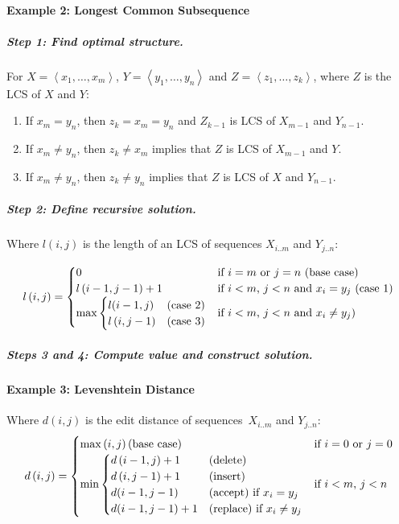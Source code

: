 \documentclass[twocolumn,english]{article}
\numberwithin{equation}{section}
\numberwithin{figure}{section}
\numberwithin{table}{section}
\begin{document}
\paragraph{Example 2: Longest Common Subsequence}

\subparagraph{Step 1: Find optimal structure.}

For $X=\left\langle x_{1},\dots,x_{m}\right\rangle $, $Y=\left\langle y_{1},\dots,y_{n}\right\rangle $
and $Z=\left\langle z_{1},\dots,z_{k}\right\rangle $, where $Z$
is the LCS of $X$ and $Y$:
\begin{enumerate}
\item If $x_{m}=y_{n}$, then $z_{k}=x_{m}=y_{n}$ and $Z_{k-1}$ is LCS
of $X_{m-1}$ and $Y_{n-1}$.
\item If $x_{m}\neq y_{n}$, then $z_{k}\neq x_{m}$ implies that $Z$ is
LCS of $X_{m-1}$ and $Y$.
\item If $x_{m}\neq y_{n}$, then $z_{k}\neq y_{n}$ implies that $Z$ is
LCS of $X$ and $Y_{n-1}$.
\end{enumerate}

\subparagraph{Step 2: Define recursive solution.}

Where $l\left(i,j\right)$ is the length of an LCS of sequences $X_{i..m}$
and $Y_{j..n}$:

\[
l\left(i,j\right)=\begin{cases}
0 & \text{if \ensuremath{i=m} or \ensuremath{j=n} (base case)}\\
l\left(i-1,j-1\right)+1 & \text{if \ensuremath{i<m}, \ensuremath{j<n} and \ensuremath{x_{i}=y_{j}} (case 1)}\\
\max\begin{cases}
l(i-1,j) & \text{(case 2)}\\
l\left(i,j-1\right) & \text{(case 3)}
\end{cases} & \text{if \ensuremath{i<m}, \ensuremath{j<n} and \ensuremath{x_{i}\neq y_{j}})}
\end{cases}
\]

\subparagraph{Steps 3 and 4: Compute value and construct solution.}

\paragraph{Example 3: Levenshtein Distance}

Where $d\left(i,j\right)$ is the edit distance of sequences~$X_{i..m}$
and $Y_{j..n}$:
\[
d\left(i,j\right)=\begin{cases}
\max\left(i,j\right) \text{(base case)} & \text{if \ensuremath{i=0} or \ensuremath{j=0}}\\
\min\begin{cases}
d\left(i-1,j\right)+1 & \text{(delete)}\\
d\left(i,j-1\right)+1 & \text{(insert)}\\
d(i-1,j-1) & \text{(accept) if \ensuremath{x_{i}=y_{j}}}\\
d(i-1,j-1) + 1 & \text{(replace) if \ensuremath{x_{i}\neq y_{j}}}
\end{cases} & \text{if \ensuremath{i<m}, \ensuremath{j<n}}\\
\end{cases}
\]
\end{document}
